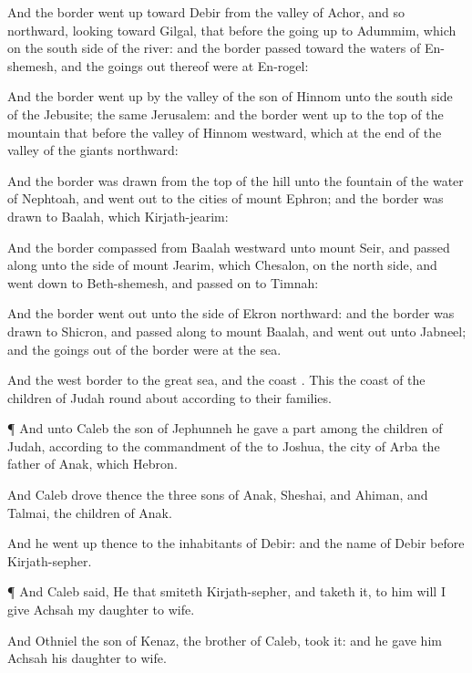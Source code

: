 {And the
border went
up toward
Debir from the
valley of
Achor, and so
northward,
looking toward
Gilgal, that
{}
before the going
up to
Adummim, which
{} on the south
side of the
river: and the
border
passed toward the
waters of
En-shemesh, and the goings
out thereof were at
En-rogel:

And the
border went
up by the
valley of the
son of
Hinnom unto the
south
side of the
Jebusite; the same
{}
Jerusalem: and the
border went
up to the
top of the
mountain that
{}
before the
valley of
Hinnom
westward, which
{} at the
end of the
valley of the
giants
northward:

And the
border was
drawn from the
top of the
hill unto the
fountain of the
water of
Nephtoah, and went
out to the
cities of
mount
Ephron; and the
border was
drawn to
Baalah, which
{}
Kirjath-jearim:

And the
border
compassed from
Baalah
westward unto
mount
Seir, and
passed along unto the
side of
mount
Jearim, which
{}
Chesalon, on the north
side, and went
down to
Beth-shemesh, and passed
on to
Timnah:

And the
border went
out unto the
side of
Ekron
northward: and the
border was
drawn to
Shicron, and passed
along to
mount
Baalah, and went
out unto
Jabneel; and the goings
out of the
border were at the
sea.

And the
west
border
{} to the
great
sea, and the
coast
{}. This
{} the
coast of the
children of
Judah round
about according to their
families.


\par }{\PP {}¶ And unto
Caleb the
son of
Jephunneh he
gave a
part
among the
children of
Judah,
according to the
commandment of the
{} to
Joshua,
{} the
city of
Arba the
father of
Anak, which
{}
Hebron.

And
Caleb
drove thence the
three
sons of
Anak,
Sheshai, and
Ahiman, and
Talmai, the
children of
Anak.

And he went
up thence to the
inhabitants of
Debir: and the
name of
Debir
before
{}
Kirjath-sepher.


\par }{\PP {}¶ And
Caleb
said, He that
smiteth
Kirjath-sepher, and
taketh it, to him will I
give
Achsah my
daughter to
wife.

And
Othniel the
son of
Kenaz, the
brother of
Caleb,
took it: and he
gave him
Achsah his
daughter to
wife.

}
